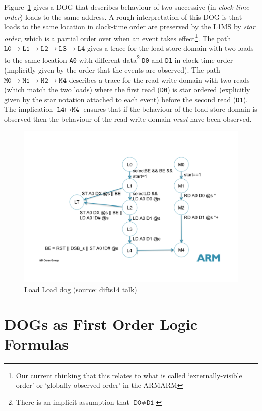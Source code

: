 \documentclass[10pt]{paper}
\newcommand{\state}[1]{\texttt{#1}}
\begin{document}
Figure~\ref{fig:load-load-dog} gives a DOG that describes behaviour of two successive (in \emph{clock-time order}) loads to the same address.
%
A rough interpretation of this DOG is that loads to the same location in clock-time order are preserved by the L1MS by \emph{star order}, which is a partial order over when an event takes effect\footnote{Our current thinking that this relates to what is called `externally-visible order' or `globally-observed order' in the ARMARM}.
%
The path
  $\state{L0} \rightarrow \state{L1}
              \rightarrow \state{L2}
              \rightarrow \state{L3}
              \rightarrow \state{L4}$
gives a trace for the load-store domain with two loads to the same location \texttt{A0} with different data\footnote{There is an implicit assumption that $\texttt{D0} \neq \texttt{D1}$} \texttt{D0} and \texttt{D1} in clock-time order (implicitly given by the order that the events are observed).
%
The path
  $\state{M0} \rightarrow \state{M1}
              \rightarrow \state{M2}
              \rightarrow \state{M4}$
describes a trace for the read-write domain with two reads (which match the two loads) where the first read (\texttt{D0}) is star ordered (explicitly given by the star notation attached to each event) before the second read (\texttt{D1}).
%
The implication $\state{L4} \mapsto \state{M4}$ ensures that if the behaviour of the load-store domain is observed then the behaviour of the read-write domain \emph{must} have been observed.

\begin{figure}[t]
\centering
  \includegraphics[width=.75\textwidth]{figures/loadload.pdf}
\caption{Load Load dog (source: difts14 talk)}
\label{fig:load-load-dog}
\end{figure}

\section{DOGs as First Order Logic Formulas}
\end{document}
